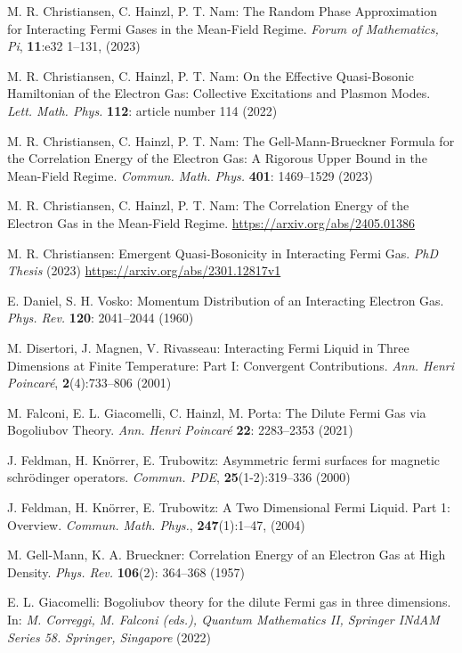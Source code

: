 \documentclass[12pt,a4paper]{article}
\numberwithin{equation}{section}
\newcommand{\1}{\mathbb{I}}
\theoremstyle{plain}
\theoremstyle{definition}
\theoremstyle{remark}
\theoremstyle{plain}
\theoremstyle{definition}
\theoremstyle{remark}
\begin{document}
\begin{thebibliography}{29}
M. R. Christiansen, C. Hainzl, P. T. Nam:
	The Random Phase Approximation for Interacting Fermi Gases in the Mean-Field Regime.
	\emph{Forum of Mathematics, Pi}, \textbf{11}:e32 1--131, (2023)

M. R. Christiansen, C. Hainzl, P. T. Nam:
	On the Effective Quasi-Bosonic Hamiltonian of the Electron Gas: Collective Excitations and Plasmon Modes.
	\emph{Lett. Math. Phys.} \textbf{112}: article number 114 (2022)

M. R. Christiansen, C. Hainzl, P. T. Nam:
	The Gell-Mann-Brueckner Formula for the Correlation Energy of the Electron Gas: A Rigorous Upper Bound in the Mean-Field Regime.
	\emph{Commun. Math. Phys.} \textbf{401}: 1469--1529 (2023)

M. R. Christiansen, C. Hainzl, P. T. Nam:
	The Correlation Energy of the Electron Gas in the Mean-Field Regime.
	\url{https://arxiv.org/abs/2405.01386}

M. R. Christiansen:
	Emergent Quasi-Bosonicity in Interacting Fermi Gas.
	\emph{PhD Thesis} (2023)
	\url{https://arxiv.org/abs/2301.12817v1}

E. Daniel, S. H. Vosko:
	Momentum Distribution of an Interacting Electron Gas.
	\emph{Phys. Rev.} \textbf{120}: 2041--2044 (1960)

M. Disertori, J. Magnen, V. Rivasseau:
	Interacting {{Fermi Liquid}} in {{Three Dimensions}} at {{Finite
  Temperature}}: {{Part I}}: {{Convergent Contributions}}.
	\emph{Ann. Henri Poincar\'e}, \textbf{2}(4):733--806 (2001)

M. Falconi, E. L. Giacomelli, C. Hainzl, M. Porta:
	The Dilute Fermi Gas via Bogoliubov Theory.
	\emph{Ann. Henri Poincar\'e} \textbf{22}: 2283--2353 (2021)

J. Feldman, H. Kn{\"o}rrer, E. Trubowitz:
	Asymmetric fermi surfaces for magnetic schr\"odinger operators.
	\emph{Commun. PDE},
  \textbf{25}(1-2):319--336 (2000)

J. Feldman, H. Kn{\"o}rrer,  E. Trubowitz:
	A {{Two Dimensional Fermi Liquid}}. {{Part}} 1: {{Overview}}.
	\emph{Commun. Math. Phys.}, \textbf{247}(1):1--47, (2004)

M. Gell-Mann, K. A. Brueckner:
	Correlation Energy of an Electron Gas at High Density.
	\emph{Phys. Rev.} \textbf{106}(2): 364--368 (1957)

E. L. Giacomelli:
	Bogoliubov theory for the dilute Fermi gas in three dimensions.
	In: \emph{M. Correggi, M. Falconi (eds.), Quantum Mathematics II, Springer INdAM Series 58. Springer, Singapore} (2022)


\end{thebibliography}
\end{document}
